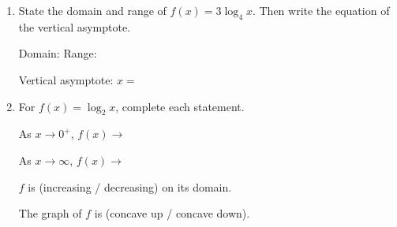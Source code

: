 \documentclass[10pt]{article}
\begin{document}
\namedateperiod

\vspace{0.15in}

\begin{enumerate}[leftmargin=1.8em, itemsep=18pt]

\item State the domain and range of $f(x) = 3\log_4 x$. Then write the equation of the
      vertical asymptote.

\vspace{6pt}
Domain: \blank{4cm} \qquad Range: \blank{4cm}

\vspace{8pt}
Vertical asymptote: $x = $ \blank{2cm}

\vspace{10pt}

\item For $f(x) = \log_2 x$, complete each statement.

\vspace{6pt}
As $x \to 0^+$, \quad $f(x) \to $ \blank{2.5cm}

\vspace{8pt}
As $x \to \infty$, \quad $f(x) \to $ \blank{2.5cm}

\vspace{8pt}
$f$ is \hspace{0.3cm} \blank{3.5cm} \hspace{0.3cm} (increasing / decreasing) on its domain.

\vspace{8pt}
The graph of $f$ is \hspace{0.3cm} \blank{3.5cm} \hspace{0.3cm} (concave up / concave down).

\end{enumerate}
\end{document}
